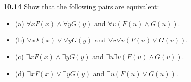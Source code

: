\documentclass{ctexart}
\begin{document}
\section*{}
\textbf{10.14}
Show that the following pairs are equivalent:
\begin{itemize}
\item (a) $\forall x F(x) \land \forall yG(y)$ and $\forall u(F(u) \land G(u))$.
\item (b) $\forall x F(x) \lor \forall yG(y)$ and $\forall u\forall v(F(u) \lor G(v))$.
\item (c) $\exists x F(x) \land \exists yG(y)$ and $\exists u\exists v(F(u) \land G(v))$.
\item (d) $\exists x F(x) \lor \exists yG(y)$ and $\exists u(F(u) \lor G(u))$.
\end{itemize}
\end{document}
